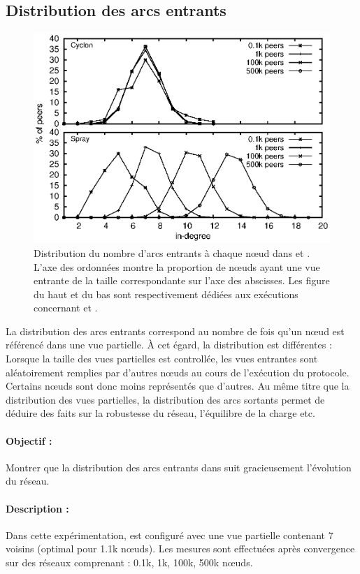 \subsection{Distribution des arcs entrants}
\label{net:subsec:inview}

\begin{figure}
  \centering
  \includegraphics[width=.8\textwidth]{img/spray/histo.eps}
  \caption[Distribution du nombre d'arcs entrants]{\label{net:fig:inview} Distribution
    du nombre d'arcs entrants à chaque nœud dans \CYCLON et \SPRAY. L'axe des
    ordonnées montre la proportion de nœuds ayant une vue entrante de la taille
    correspondante sur l'axe des abscisses. Les figure du haut et du bas sont
    respectivement dédiées aux exécutions concernant \CYCLON et \SPRAY.}
\end{figure}

La distribution des arcs entrants correspond au nombre de fois qu'un nœud est
référencé dans une vue partielle. À cet égard, la distribution est différentes :
Lorsque la taille des vues partielles est controllée, les vues entrantes sont
aléatoirement remplies par d'autres nœuds au cours de l'exécution du
protocole. Certains nœuds sont donc moins représentés que d'autres.  Au même
titre que la distribution des vues partielles, la distribution des arcs sortants
permet de déduire des faits sur la robustesse du réseau, l'équilibre de la
charge etc. 

\paragraph{Objectif :} Montrer que la distribution des arcs entrants dans \SPRAY
suit gracieusement l'évolution du réseau.

\paragraph{Description :} Dans cette expérimentation, \CYCLON est configuré avec
une vue partielle contenant 7 voisins (optimal pour 1.1k nœuds). Les mesures
sont effectuées après convergence sur des réseaux comprenant : 0.1k, 1k, 100k,
500k nœuds.

